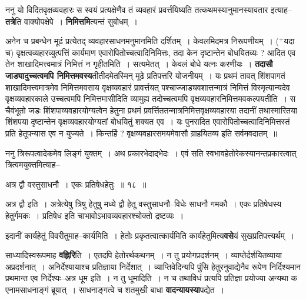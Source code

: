 \documentclass[article,12pt,a4paper]{memoir}
\newcommand{\add}[1]{($^{+}$#1)}
\begin{document}
	  \pstart ननु यो विदितवृक्षव्यवहारः स स्वयं प्रत्यक्षेणैव तं व्यवहारं प्रवर्त्तयिष्यति तत्कथमस्यानुमानस्यावतार इत्याह--\textbf{तत्रे}ति वाक्योपक्षेपे । \textbf{निमित्तमि}त्यन्तं सुबोधम् ।
	\pend
      

	  \pstart अनेन च प्रबन्धेन मूढं प्रत्येतद् व्यवहारसाधनमनुमानमिति दर्शितम् । केवलमिदमत्र निरूपणीयम् । \add{यदा च} वृक्षत्वव्यहारव्युत्पत्तिं कार्यमाण एवारोपितोच्चत्वादिनिमित्तः, तदा केन दृष्टान्तेन बोधयितव्यः ? आदित एव तेन शाखादिमत्त्वमात्रं निमित्तं न गृहीतमिति । सत्यमेतत् । केवलं बोधे यत्नः करणीयः । \textbf{तदासौ जाड्यादुच्चत्वमपि निमित्तमवस्य}तीतीदमेतस्मिन् मूढे प्रतिपत्तरि योजनीयम् । यः प्रथमं तावत् शिंशपागतं शाखादिमत्त्वमात्रमेव निमित्तमवसाय वृक्षव्यवहारं प्रावर्त्तयत् पश्चाज्जाड्यवशात्तन्मात्रं निमित्तं विस्मृत्यान्यदेव वृक्षव्यवहारकाले उच्चत्वमपि निमित्तमासीदिति व्यामुह्य तदोच्चत्वमपि वृक्षव्यवहारनिमित्तमवकल्पयतीति । स चैवंभूतो जडः शिंशपाव्यवहारयोग्यत्वेन हेतुना प्रथमं प्रवर्त्तिततन्मात्रनिमित्तवृक्षव्यवहारया तदानीं तथास्मारितया शिंशपया दृष्टान्तेन वृक्षव्यवहारयोग्यतां बोधयितुं शक्यत एव । यः पुनरादित एवारोपितोच्चत्वादिनिमित्तस्तं प्रति हेतूपन्यास एव न युज्यते । किन्तर्हि ? वृक्षव्यवहारसमयमेवासौ ग्राहयितव्य इति सर्वमवदातम् ॥
	\pend
	  \bigskip
	  \begingroup
	

	  \pstart ननु त्रिरूपत्वादेकमेव लिङ्गं युक्तम् । अथ प्रकारभेदाद्भेदः । एवं सति स्वभावहेतोरेकस्यानन्तप्रकारत्वात् त्रित्वमयुक्तमित्याह--
	\pend
        
	  \bigskip
	  \begingroup
	

	  \pstart अत्र द्वौ वस्तुसाधनौ । एकः प्रतिषेधहेतुः ॥ १८ ॥
	\pend
      
	  \endgroup
	 

	  \pstart अत्र द्वौ इति । अत्रेत्येषु त्रिषु हेतुषु मध्ये द्वौ हेतू वस्तुसाधनौ--विधेः साधनौ गमकौ । एकः प्रतिषेधस्य हेतुर्गमकः । प्रतिषेध इति चाभावोऽभावव्यवहारश्चोक्तो द्रष्टव्यः ।
	\pend
      
	  \endgroup
	

	  \pstart इदानीं कार्यहेतुं विवरीतुमाह--कार्यमिति । हेतोः प्रकृतत्वात्कार्यमिति कार्यहेतुमित्य\textbf{वसे}यं सुखप्रतिपत्त्यर्थम् ।
	\pend
      

	  \pstart साध्यादिस्वरूपमाह \textbf{वह्निरि}ति । एतदपि हेतोरर्थकथनम् । न तु प्रयोगप्रदर्शनम् । व्याप्तेर्दर्शयितव्याया अप्रदर्शनात् । अनिर्देश्यायाश्च प्रतिज्ञाया निर्देशात् । व्याप्तिवेदिन्यपि पुंसि हेतुरनुवाद्येनैव रूपेण निर्दिश्यमान प्रथमान्त एव निर्देश्यः--अत्र धूम इति । न तु धूमादिति । न च तथाविधं प्रत्यपि प्रतिज्ञा प्रयोज्या अन्यथा क एनामसाधनाङ्गं ब्रूयात् । साधनाङ्गत्वे च शतमुखी बाधा \textbf{वादन्यायस्या}पद्येत ।
	\pend
      
\end{document}
